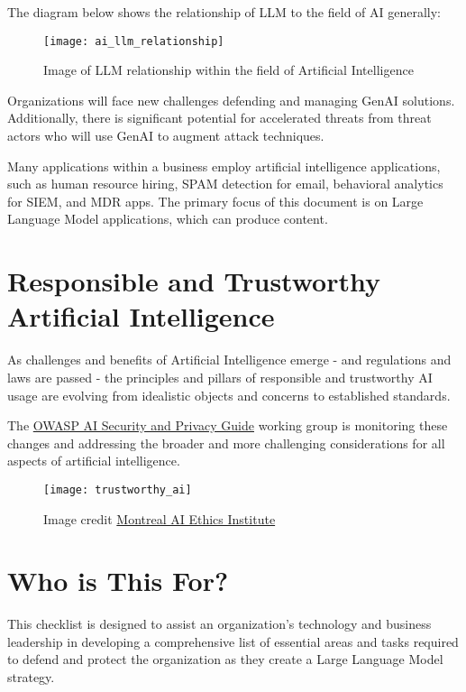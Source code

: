 \clearpage
The diagram below shows the relationship of LLM to the field of AI generally:

\begin{figure}[h]
  \centering
  \texttt{[image: ai\_llm\_relationship]}
  \caption{Image of LLM relationship within the field of Artificial Intelligence}
  \label{fig:ai-llm-relationship}
\end{figure}

Organizations will face new challenges defending and managing GenAI solutions.
Additionally, there is significant potential for accelerated threats from threat
actors who will use GenAI to augment attack techniques.

Many applications within a business employ artificial intelligence applications,
such as human resource hiring, SPAM detection for email, behavioral analytics
for SIEM, and MDR apps. The primary focus of this document is on Large Language
Model applications, which can produce content.


\section{Responsible and Trustworthy Artificial Intelligence}

As challenges and benefits of Artificial Intelligence emerge - and regulations
and laws are passed - the principles and pillars of responsible and trustworthy
AI usage are evolving from idealistic objects and concerns to established
standards.

The \href{https://owasp.org/www-project-ai-security-and-privacy-guide/}{OWASP AI Security and Privacy Guide}
working group is monitoring these changes and addressing the broader and more
challenging considerations for all aspects of artificial intelligence.

\begin{figure}[h]
  \centering
  \texttt{[image: trustworthy\_ai]}
  \caption{Image credit \href{https://montrealethics.ai/}{Montreal AI Ethics Institute}}
  \label{fig:trustworthy-ai}
\end{figure}


\section{Who is This For?}
This checklist is designed to assist an organization's technology and business
leadership in developing a comprehensive list of essential areas and tasks
required to defend and protect the organization as they create a Large Language
Model strategy.

